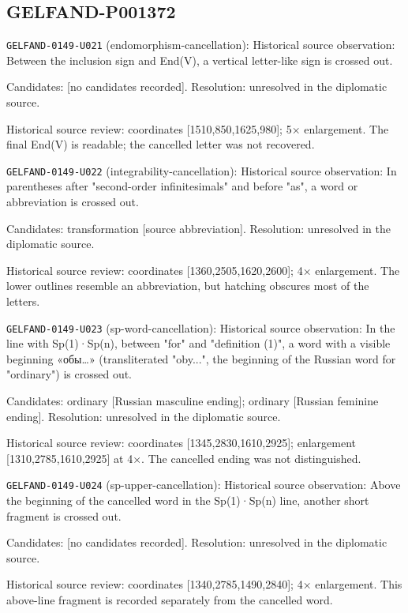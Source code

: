 \subsection*{GELFAND-P001372}
\noindent\texttt{GELFAND-0149-U021} (endomorphism-cancellation): Historical source observation: Between the inclusion sign and End(V), a vertical letter-like sign is crossed out.\par
Candidates: [no candidates recorded]. Resolution: unresolved in the diplomatic source.\par
Historical source review: coordinates [1510,850,1625,980]; 5× enlargement. The final End(V) is readable; the cancelled letter was not recovered.\par

\noindent\texttt{GELFAND-0149-U022} (integrability-cancellation): Historical source observation: In parentheses after "second-order infinitesimals" and before "as", a word or abbreviation is crossed out.\par
Candidates: transformation [source abbreviation]. Resolution: unresolved in the diplomatic source.\par
Historical source review: coordinates [1360,2505,1620,2600]; 4× enlargement. The lower outlines resemble an abbreviation, but hatching obscures most of the letters.\par

\noindent\texttt{GELFAND-0149-U023} (sp-word-cancellation): Historical source observation: In the line with Sp(1)·Sp(n), between "for" and "definition (1)", a word with a visible beginning «обы…» (transliterated "oby...", the beginning of the Russian word for "ordinary") is crossed out.\par
Candidates: ordinary [Russian masculine ending]; ordinary [Russian feminine ending]. Resolution: unresolved in the diplomatic source.\par
Historical source review: coordinates [1345,2830,1610,2925]; enlargement [1310,2785,1610,2925] at 4×. The cancelled ending was not distinguished.\par

\noindent\texttt{GELFAND-0149-U024} (sp-upper-cancellation): Historical source observation: Above the beginning of the cancelled word in the Sp(1)·Sp(n) line, another short fragment is crossed out.\par
Candidates: [no candidates recorded]. Resolution: unresolved in the diplomatic source.\par
Historical source review: coordinates [1340,2785,1490,2840]; 4× enlargement. This above-line fragment is recorded separately from the cancelled word.\par

